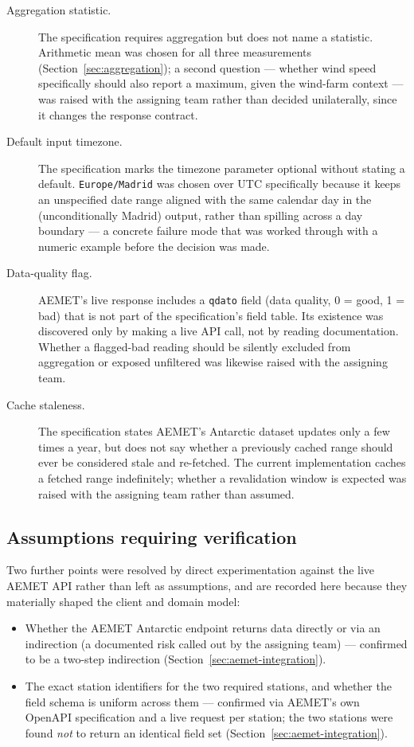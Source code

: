 \documentclass[11pt,a4paper]{article}
\begin{document}
\begin{description}
    \item[Aggregation statistic.] The specification requires aggregation
    but does not name a statistic. Arithmetic mean was chosen for all
    three measurements (Section~\ref{sec:aggregation}); a second question
    --- whether wind speed specifically should also report a maximum,
    given the wind-farm context --- was raised with the assigning team
    rather than decided unilaterally, since it changes the response
    contract.
    \item[Default input timezone.] The specification marks the timezone
    parameter optional without stating a default. \texttt{Europe/Madrid}
    was chosen over UTC specifically because it keeps an unspecified date
    range aligned with the same calendar day in the (unconditionally
    Madrid) output, rather than spilling across a day boundary --- a
    concrete failure mode that was worked through with a numeric example
    before the decision was made.
    \item[Data-quality flag.] AEMET's live response includes a
    \texttt{qdato} field (data quality, 0 = good, 1 = bad) that is not
    part of the specification's field table. Its existence was discovered
    only by making a live API call, not by reading documentation. Whether
    a flagged-bad reading should be silently excluded from aggregation
    or exposed unfiltered was likewise raised with the assigning team.
    \item[Cache staleness.] The specification states AEMET's Antarctic
    dataset updates only a few times a year, but does not say whether a
    previously cached range should ever be considered stale and
    re-fetched. The current implementation caches a fetched range
    indefinitely; whether a revalidation window is expected was raised
    with the assigning team rather than assumed.
\end{description}

\subsection{Assumptions requiring verification}

Two further points were resolved by direct experimentation against the live
AEMET API rather than left as assumptions, and are recorded here because
they materially shaped the client and domain model:

\begin{itemize}[nosep]
    \item Whether the AEMET Antarctic endpoint returns data directly or
    via an indirection (a documented risk called out by the assigning
    team) --- confirmed to be a two-step indirection
    (Section~\ref{sec:aemet-integration}).
    \item The exact station identifiers for the two required stations,
    and whether the field schema is uniform across them --- confirmed via
    AEMET's own OpenAPI specification and a live request per station; the
    two stations were found \emph{not} to return an identical field set
    (Section~\ref{sec:aemet-integration}).
\end{itemize}
\end{document}
